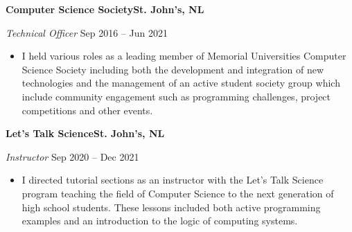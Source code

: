 \textbf{Computer Science Society\hfill St. John's, NL}\par
\textit{Technical Officer} \hfill Sep 2016 -- Jun 2021
\begin{itemize}
	\item I held various roles as a leading member of Memorial Universities Computer Science Society including both the development and integration of new technologies and the management of an active student society group which include community engagement such as programming challenges, project competitions and other events.
\end{itemize}\par

\textbf{Let’s Talk Science\hfill St. John's, NL}\par
\textit{Instructor} \hfill Sep 2020 -- Dec 2021
\begin{itemize}
	\item I directed tutorial sections as an instructor with the Let’s Talk Science program teaching the field of Computer Science to the next generation of high school students.  These lessons included both active programming examples and an introduction to the logic of computing systems.
\end{itemize}\par